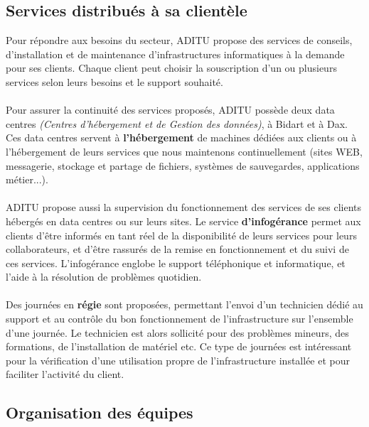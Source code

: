 \begin{sloppypar}
\subsection{Services distribués à sa clientèle}

Pour répondre aux besoins du secteur, ADITU propose des services de conseils, d'installation et de maintenance d'infrastructures informatiques à la demande pour ses clients. Chaque client peut choisir la souscription d'un ou plusieurs services selon leurs besoins et le support souhaité.
\\ \\
Pour assurer la continuité des services proposés, ADITU possède deux data centres \textit{(Centres d'hébergement et de Gestion des données)}, à Bidart et à Dax. Ces data centres servent à \textbf{l'hébergement} de machines dédiées aux clients ou à l'hébergement de leurs services que nous maintenons continuellement (sites WEB, messagerie, stockage et partage de fichiers, systèmes de sauvegardes, applications métier...).
\\ \\
ADITU propose aussi la supervision du fonctionnement des services de ses clients hébergés en data centres ou sur leurs sites. Le service \textbf{d'infogérance} permet aux clients d'être informés en tant réel de la disponibilité de leurs services pour leurs collaborateurs, et d'être rassurés de la remise en fonctionnement et du suivi de ces services. L'infogérance englobe le support téléphonique et informatique, et l'aide à la résolution de problèmes quotidien.
\\ \\
Des journées en \textbf{régie} sont proposées, permettant l'envoi d'un technicien dédié au support et au contrôle du bon fonctionnement de l'infrastructure sur l'ensemble d'une journée. Le technicien est alors sollicité pour des problèmes mineurs, des formations, de l'installation de matériel etc. Ce type de journées est intéressant pour la vérification d'une utilisation propre de l'infrastructure installée et pour faciliter l'activité du client.

\subsection{Organisation des équipes}


\end{sloppypar}
